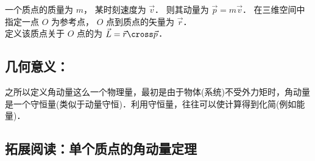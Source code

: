 一个质点的质量为 $m$， 某时刻速度为 $\vec v$． 则其动量为 $\vec p = m\vec v$． 在三维空间中指定一点 $O$ 为参考点， $O$ 点到质点的矢量为 $\vec r$． \\
定义该质点关于 $O$ 点的为 $\vec L = \vec r \cross \vec p$． 
\subsection{几何意义：}

之所以定义角动量这么一个物理量，最初是由于物体(系统)不受外力矩时，角动量是一个守恒量(类似于动量守恒)．利用守恒量，往往可以使计算得到化简(例如能量)．
\subsection{拓展阅读：单个质点的角动量定理}%

